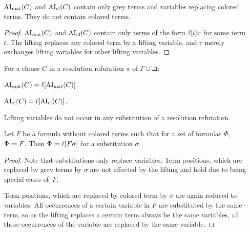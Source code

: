 \documentclass[,%
	paper=a4,%
	DIV14, %
	twoside=false,%
	liststotoc,
	bibtotoc,
	draft=false,%
	numbers=noendperiod
]{scrartcl}
\begin{document}
\begin{lemma}
	\label{lemma:no_colored_terms}
	$\operatorname{AI}_\mathrm{mat}(C)$ and $\operatorname{AI}_\mathrm{cl}(C)$ contain only grey terms and variables replacing colored terms. They do not contain colored terms.
\end{lemma}
\begin{proof}
	$\operatorname{AI}_\mathrm{mat}(C)$ and $\operatorname{AI}_\mathrm{cl}(C)$ contain only terms of the form $\ell[t]\tau$ for some term $t$.
	The lifting replaces any colored term by a lifting variable, and $\tau$ merely exchanges lifting variables for other lifting variables.
\end{proof}



\begin{corr}
	\label{corr:lift_ai}
	For a clause $C$ in a resolution refutation $\pi$ of $\Gamma \cup \Delta$:
	\begin{compactenum}
	\item $\operatorname{AI}_\mathrm{mat}(C) = \ell[\operatorname{AI}_\mathrm{mat}(C)]$.

	\item $\operatorname{AI}_\mathrm{cl}(C) = \ell[\operatorname{AI}_\mathrm{cl}(C)]$.
	\end{compactenum}
\end{corr}

\begin{lemma}
	\label{lemma:no_lifting_vars_in_subst}
	Lifting variables do not occur in any substitution of a resolution refutation.
\end{lemma}

\begin{lemma}
	\label{lemma:substitute_and_lift}
	Let $F$ be a formula without colored terms such that for a set of formulas $\Phi$, $\Phi \models F$.
	Then $\Phi \models \ell[F\sigma]$ for a substitution $\sigma$.
\end{lemma}
\begin{proof}
	Note that substitutions only replace variables. Term positions, which are replaced by grey terms by $\sigma$ are not affected by the lifting and hold due to being special cases of~$F$.

	Term positions, which are replaced by colored term by $\sigma$ are again reduced to variables.
	All occurrences of a certain variable in $F$ are substituted by the same term, so as the lifting replaces a certain term always be the same variables, all these occurrences of the variable are replaced by the same variable.
\end{proof}
\end{document}
